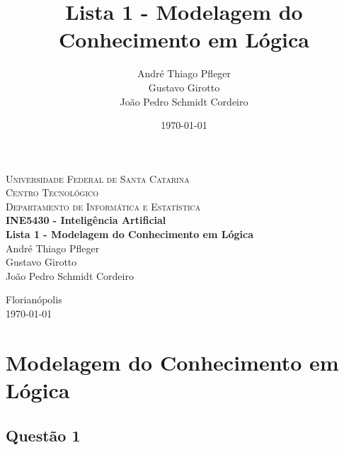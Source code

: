\documentclass[a4paper,12pt]{article}
\title{Lista 1 - Modelagem do Conhecimento em Lógica }
\author{André Thiago Pfleger \\  Gustavo Girotto \\ João Pedro Schmidt Cordeiro}
\date{\today}
\begin{document}
\begin{titlepage}
   \begin{center}
      \textsc{Universidade Federal de Santa Catarina} \\
      \textsc{Centro Tecnológico} \\
      \textsc{Departamento de Informática e Estatística} \\[4cm]

      \textbf{\Large{INE5430 - Inteligência Artificial}} \\[2cm]

      \textbf{\huge{Lista 1 - Modelagem do Conhecimento em Lógica }} \\[3cm]

      André Thiago Pfleger \\
      Gustavo Girotto \\
      João Pedro Schmidt Cordeiro \\
      
      \vfill
      
      {Florianópolis} \\
      {\today}
   \end{center}
\end{titlepage}

\section{Modelagem do Conhecimento em Lógica}
\subsection{Questão 1}



\end{document}
